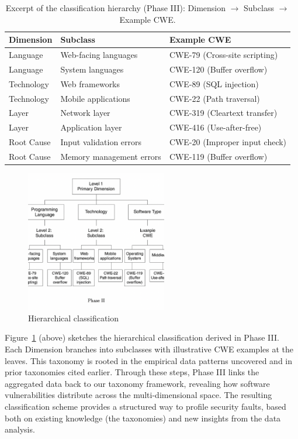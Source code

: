 \begin{table}[h!]
\centering
\caption{Excerpt of the classification hierarchy (Phase III): Dimension $\rightarrow$ Subclass $\rightarrow$ Example CWE.}
\label{tab:classification}
\begin{tabular}{lll}
\hline
\textbf{Dimension} & \textbf{Subclass} & \textbf{Example CWE} \\
\hline
Language & Web-facing languages & CWE-79 (Cross-site scripting) \\
Language & System languages & CWE-120 (Buffer overflow) \\
Technology & Web frameworks & CWE-89 (SQL injection) \\
Technology & Mobile applications & CWE-22 (Path traversal) \\
Layer & Network layer & CWE-319 (Cleartext transfer) \\
Layer & Application layer & CWE-416 (Use-after-free) \\
Root Cause & Input validation errors & CWE-20 (Improper input check) \\
Root Cause & Memory management errors & CWE-119 (Buffer overflow) \\
\hline
\end{tabular}
\end{table}


\begin{figure}[!h]
	\centering
    \includegraphics[width=0.55\textwidth]{figures/chapter_2/classification-hierarchy.png}
	\caption{Hierarchical classification}
	\label{fig:classification-hierarchy}
\end{figure}


Figure~\ref{fig:classification-hierarchy} (above) sketches the hierarchical classification derived in Phase III. Each Dimension branches into subclasses with illustrative CWE examples at the leaves. This taxonomy is rooted in the empirical data patterns uncovered and in prior taxonomies cited earlier. Through these steps, Phase III links the aggregated data back to our taxonomy framework, revealing how software vulnerabilities distribute across the multi-dimensional space. The resulting classification scheme provides a structured way to profile security faults, based both on existing knowledge (the taxonomies) and new insights from the data analysis.